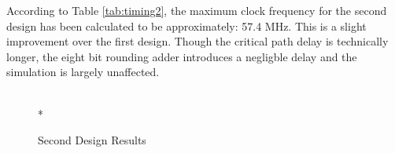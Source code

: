 According to Table \ref{tab:timing2}, the maximum clock frequency for the second design has been calculated to be approximately: 57.4 MHz. This is a slight improvement over the first design. Though the critical path delay is technically longer, the eight bit rounding adder introduces a negligble delay and the simulation is largely unaffected.  

\begin{figure}[htp]
  \begin{center}
     \\*
  \end{center}
  \caption{Second Design Results}
  \label{fig:design2_results}
\end{figure}
